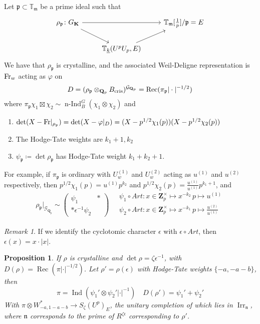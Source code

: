 \documentclass[leqno]{amsart}
\newcommand{\wt}[1]{\underline{ #1 }}
\newcommand{\TT}{\mathbb{T}} %
\newcommand{\Gp}{\mathcal{G}_{\Qp}} %
\newcommand{\Fr}{\textnormal{Fr}} %
\newcommand{\cris}{\textnormal{cris}}
\DeclareMathOperator{\Irr}{Irr}
\DeclareMathOperator{\Rec}{Rec}
\newcommand{\Qp}{\mathbf{Q}_p}
\newcommand{\Zp}{\mathbf{Z}_p}
\newcommand{\K}{{\mathbf{K}}} %
\newcommand{\fm}{\mathfrak{m}}
\newcommand{\fn}{\mathfrak{n}}
\newcommand{\fp}{\mathfrak{p}}
\DeclareMathOperator{\Ind}{Ind}
\DeclareMathOperator{\nInd}{n-Ind}
\newtheorem{prop}[thm]{Proposition}
\theoremstyle{definition}
\theoremstyle{remark}
\newtheorem{rem}[thm]{Remark}
\begin{document}
Let $\fp\subset \TT_\fm$ be a prime ideal such that 
\[
\begin{tikzcd}
	\rho_\fp\colon G_\K\arrow[dr]\arrow[rr]
	&& \TT_\fm[\frac{1}{p}]/\fp=E\\
	& \TT_{\wt{k}}(U^pU_p,E)\arrow[ur]
\end{tikzcd}
\]
We have that $\rho_\fp$ is crystalline, and 
the associated Weil-Deligne representation 
is $\Fr_w$ acting as  $\varphi$ on 
\[
	D=(\rho_\fp\otimes_{\Qp}B_{\cris})^{\Gp}=
	\Rec(\pi_\fp|\cdot|^{-1/2})
\]
where $\pi_\fp\chi_1\boxtimes\chi_2\sim
\nInd_B^G(\chi_1\otimes\chi_2)$ and
 \begin{enumerate}[label=(\alph*)]
	\item $\det(X-\Fr\vert_{\rho_\fp})=
		\det(X-\varphi\vert_D)=
		(X-p^{1/2}\chi_1(p))(X-p^{1/2}\chi_2(p))$
	\item The Hodge-Tate weights are $k_1+1, k_2$
	\item  $\psi_\fp\coloneqq \det \rho_\fp$ 
		has Hodge-Tate weight $k_1+k_2+1$.
\end{enumerate}
For example,
if $\pi_\fp$ is ordinary
with  $U_w^{(1)}$ and $U_w^{(2)}$ acting as
$u^{(1)}$ and $u^{(2)}$ respectively, then 
$p^{1/2}\chi_1(p)=u^{(1)}p^{k_2}$ and
$p^{1/2}\chi_2(p)=\frac{u^{(1)}}{u^{(1)}}p^{k_1+1}$, and
\[
	\rho_{\fp}\vert_{\Gp}\sim
	\begin{pmatrix}
		\psi_1&*\\*\epsilon^{-1}\psi_2
	\end{pmatrix}
	\quad
	\begin{aligned}
		\psi_1\circ Art\colon 
		x\in \Zp^\times\mapsto x^{-k_2}\,
		p\mapsto u^{(1)}\\
		\psi_2\circ Art\colon 
		x\in \Zp^\times\mapsto x^{-k_1}\,
		p\mapsto \frac{u^{(2)}}{u^{(1)}}\\
	\end{aligned}
\]
\begin{rem}
	If we identify the cyclotomic character
	$\epsilon$ with $\epsilon\circ Art$,
	then  $\epsilon(x)=x\cdot |x|$.
\end{rem}

\begin{prop}
	If $\rho$ is crystalline and 
	$\det \rho=\zeta\epsilon^{-1}$,
	with $D(\rho)=\Rec(\pi|\cdot|^{-1/2})$.
	Let $\rho'=\rho(\epsilon)$
	with Hodge-Tate weights
	$\{-a,-a-b\}$, then 
	 \[
		\pi=\Ind(\psi_1'\otimes\psi_2'|\cdot|^{-1})
		\quad D(\rho')=\psi_1'+\psi_2'
	\]
	With $\pi\otimes W_{-a,1-a-b}^*\to S_\zeta(U^p)_E$,
	the unitary completion of which 
	lies in $\Irr_\fn$, where  $\fn$ 
	corresponds to the prime of $R^{\zeta\epsilon}$
	corresponding to $\rho'$.
\end{prop}
\end{document}
